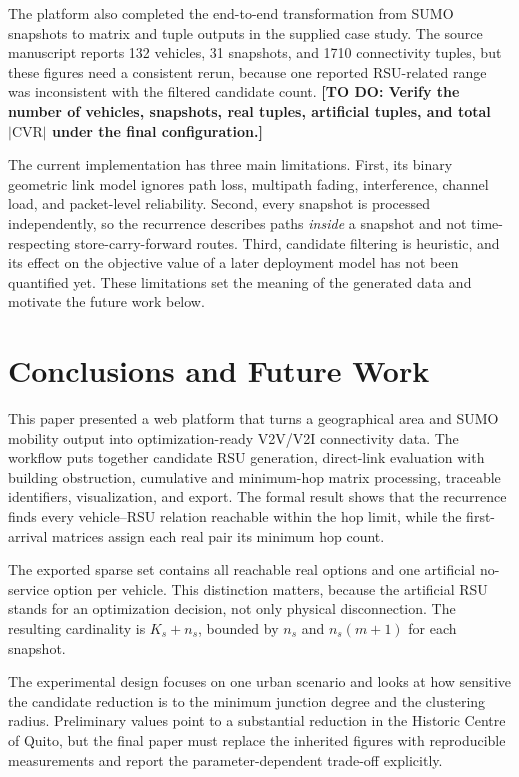 \documentclass[engproc,proceedingpaper,submit,oneauthor]{Definitions/mdpi}
\newcommand{\todo}[1]{{\color{todored}\textbf{[TO DO: #1]}}}
\newcommand{\CVR}{\mathrm{CVR}}
\begin{document}
	The platform also completed the end-to-end transformation from SUMO snapshots to
	matrix and tuple outputs in the supplied case study. The source manuscript reports 132
	vehicles, 31 snapshots, and 1710 connectivity tuples, but these figures need a
	consistent rerun, because one reported RSU-related range was inconsistent with the
	filtered candidate count. \todo{Verify the number of vehicles, snapshots, real tuples,
		artificial tuples, and total $|\CVR|$ under the final configuration.}
	
	The current implementation has three main limitations. First, its binary geometric
	link model ignores path loss, multipath fading, interference, channel load, and
	packet-level reliability. Second, every snapshot is processed independently, so the
	recurrence describes paths \emph{inside} a snapshot and not time-respecting
	store-carry-forward routes. Third, candidate filtering is heuristic, and its effect on
	the objective value of a later deployment model has not been quantified yet. These
	limitations set the meaning of the generated data and motivate the future work below.
	
	\section{Conclusions and Future Work}\label{sec:conclusions}
	
	This paper presented a web platform that turns a geographical area and SUMO mobility
	output into optimization-ready V2V/V2I connectivity data. The workflow puts together
	candidate RSU generation, direct-link evaluation with building obstruction, cumulative
	and minimum-hop matrix processing, traceable identifiers, visualization, and export.
	The formal result shows that the recurrence finds every vehicle--RSU relation
	reachable within the hop limit, while the first-arrival matrices assign each real pair
	its minimum hop count.
	
	The exported sparse set contains all reachable real options and one artificial
	no-service option per vehicle. This distinction matters, because the artificial RSU
	stands for an optimization decision, not only physical disconnection. The resulting
	cardinality is $K_s+n_s$, bounded by $n_s$ and $n_s(m+1)$ for each snapshot.
	
	The experimental design focuses on one urban scenario and looks at how sensitive the
	candidate reduction is to the minimum junction degree and the clustering radius.
	Preliminary values point to a substantial reduction in the Historic Centre of Quito,
	but the final paper must replace the inherited figures with reproducible measurements
	and report the parameter-dependent trade-off explicitly.
	
\end{document}

